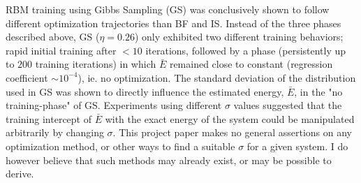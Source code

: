 \documentclass[%
oneside,                 %
final,                   %
10pt]{article}
\begin{document}
RBM training using Gibbs Sampling (GS) was conclusively shown to follow different optimization trajectories than BF and IS. Instead of the three phases described above, GS ($\eta=0.26$) only exhibited two different training behaviors; rapid initial training after $<10$ iterations, followed by a phase  (persistently up to $200$ training iterations) in which $\bar E$ remained close to constant (regression coefficient $\sim 10^{-4}$), ie. no optimization. The standard deviation of the distribution used in GS was shown to directly influence the estimated energy, $\bar E$, in the "no training-phase" of GS. Experiments using different $\sigma$ values suggested that the training intercept of $\bar E$ with the exact energy of the system could be manipulated arbitrarily by changing $\sigma$. This project paper makes no general assertions on any optimization method, or other ways to find a suitable $\sigma$ for a given system. I do however believe that such methods may already exist, or may be possible to derive. 
 \label{refer}

\end{document}
